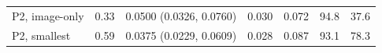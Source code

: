\begin{tabular}{lrrrrrr}
P2, image-only & 0.33 & 0.0500 (0.0326, 0.0760) & 0.030 & 0.072 & 94.8 & 37.6 \\
P2, smallest & 0.59 & 0.0375 (0.0229, 0.0609) & 0.028 & 0.087 & 93.1 & 78.3 \\
\bottomrule
\end{tabular}
